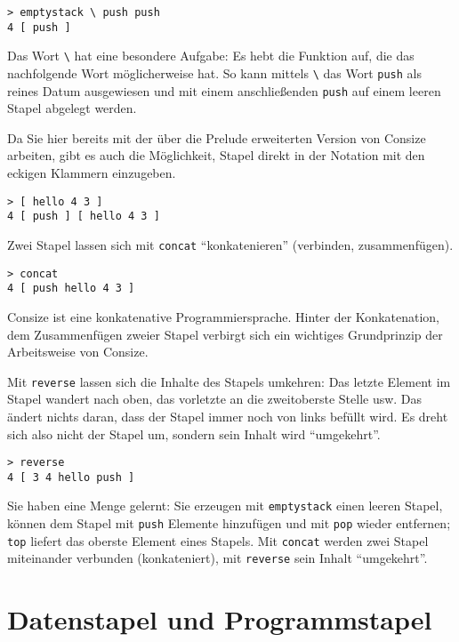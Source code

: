 \begin{verbatim}
> emptystack \ push push
4 [ push ]
\end{verbatim}

Das Wort \verb|\| hat eine besondere Aufgabe: Es hebt die Funktion auf, die das nachfolgende Wort möglicherweise hat. So kann mittels \verb|\| das Wort \verb|push| als reines Datum ausgewiesen und mit einem anschließenden \verb|push| auf einem leeren Stapel abgelegt werden.

Da Sie hier bereits mit der über die Prelude erweiterten Version von Consize arbeiten, gibt es auch die Möglichkeit, Stapel direkt in der Notation mit den eckigen Klammern einzugeben.

\begin{verbatim}
> [ hello 4 3 ]
4 [ push ] [ hello 4 3 ]
\end{verbatim}

Zwei Stapel lassen sich mit \verb|concat| "`konkatenieren"' (verbinden, zusammenfügen).

\begin{verbatim}
> concat
4 [ push hello 4 3 ]
\end{verbatim}

Consize ist eine konkatenative Programmiersprache. Hinter der Konkatenation, dem Zusammenfügen zweier Stapel verbirgt sich ein wichtiges Grundprinzip der Arbeitsweise von Consize.

Mit \verb|reverse| lassen sich die Inhalte des Stapels umkehren: Das letzte Element im Stapel wandert nach oben, das vorletzte an die zweitoberste Stelle usw. Das ändert nichts daran, dass der Stapel immer noch von links befüllt wird. Es dreht sich also nicht der Stapel um, sondern sein Inhalt wird "`umgekehrt"'.

\begin{verbatim}
> reverse
4 [ 3 4 hello push ]
\end{verbatim}

Sie haben eine Menge gelernt: Sie erzeugen mit \verb|emptystack| einen leeren Stapel, können dem Stapel mit \verb|push| Elemente hinzufügen und mit \verb|pop| wieder entfernen; \verb|top| liefert das oberste Element eines Stapels. Mit \verb|concat| werden zwei Stapel miteinander verbunden (konkateniert), mit \verb|reverse| sein Inhalt "`umgekehrt"'.

\section{Datenstapel und Programmstapel}
\label{Sec:DataCallStack}

